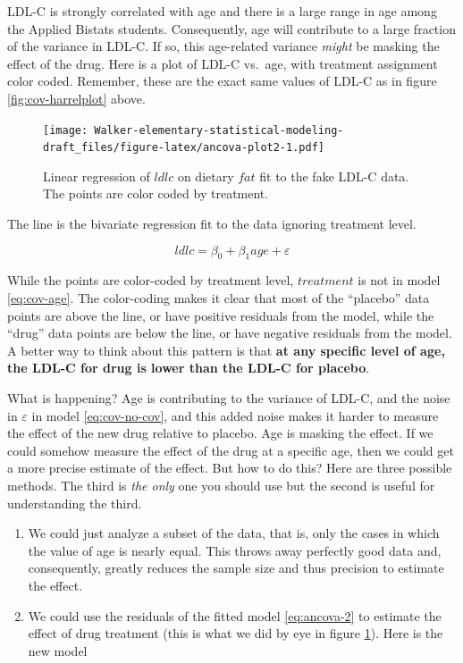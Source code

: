 \documentclass[]{book}
\begin{document}
LDL-C is strongly correlated with age and there is a large range in age among the Applied Bistats students. Consequently, age will contribute to a large fraction of the variance in LDL-C. If so, this age-related variance \emph{might} be masking the effect of the drug. Here is a plot of LDL-C vs.~age, with treatment assignment color coded. Remember, these are the exact same values of LDL-C as in figure \ref{fig:cov-harrelplot} above.

\begin{figure}
\centering
\texttt{[image: Walker-elementary-statistical-modeling-draft\_files/figure-latex/ancova-plot2-1.pdf]}
\caption{\label{fig:ancova-plot2}Linear regression of \(ldlc\) on dietary \(fat\) fit to the fake LDL-C data. The points are color coded by treatment.}
\end{figure}

The line is the bivariate regression fit to the data ignoring treatment level.

\begin{equation}
ldlc = \beta_0 + \beta_1 age + \varepsilon
\label{eq:cov-age}
\end{equation}

While the points are color-coded by treatment level, \(treatment\) is not in model \eqref{eq:cov-age}. The color-coding makes it clear that most of the ``placebo'' data points are above the line, or have positive residuals from the model, while the ``drug'' data points are below the line, or have negative residuals from the model. A better way to think about this pattern is that \textbf{at any specific level of age, the LDL-C for drug is lower than the LDL-C for placebo}.

What is happening? Age is contributing to the variance of LDL-C, and the noise in \(\varepsilon\) in model \eqref{eq:cov-no-cov}, and this added noise makes it harder to measure the effect of the new drug relative to placebo. Age is masking the effect. If we could somehow measure the effect of the drug at a specific age, then we could get a more precise estimate of the effect. But how to do this? Here are three possible methods. The third is \emph{the only} one you should use but the second is useful for understanding the third.

\begin{enumerate}
\def\labelenumi{\arabic{enumi}.}
\item
  We could just analyze a subset of the data, that is, only the cases in which the value of age is nearly equal. This throws away perfectly good data and, consequently, greatly reduces the sample size and thus precision to estimate the effect.
\item
  We could use the residuals of the fitted model \eqref{eq:ancova-2} to estimate the effect of drug treatment (this is what we did by eye in figure \ref{fig:ancova-plot2}). Here is the new model
\end{enumerate}
\end{document}
